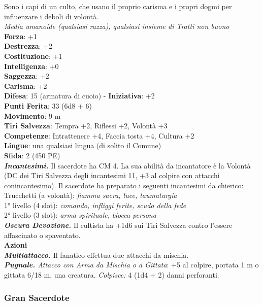 \begin{multicols}{2}
Sono i capi di un culto, che usano il proprio carisma e i propri dogmi per influenzare i deboli di volontà.\\
\emph{Media umanoide (qualsiasi razza), qualsiasi insieme di Tratti non buono}\\
\textbf{Forza}: +1\\
\textbf{Destrezza}: +2\\
\textbf{Costituzione}: +1\\
\textbf{Intelligenza}: +0\\
\textbf{Saggezza}: +2\\
\textbf{Carisma}: +2\\
\textbf{Difesa}: 15 (armatura di cuoio) - \textbf{Iniziativa}: +2\\
\textbf{Punti Ferita}: 33 (6d8 + 6)\\
\textbf{Movimento}: 9 m\\
\textbf{Tiri Salvezza}: Tempra +2, Riflessi +2, Volontà +3 \\
\textbf{Competenze}: Intrattenere +4, Faccia tosta +4, Cultura +2\\
\textbf{Lingue}: una qualsiasi lingua (di solito il Comune)\\
\textbf{Sfida}: 2 (450 PE)\smallskip\\
\emph{\textbf{Incantesimi.}} Il sacerdote ha CM 4. La sua abilità da incantatore è la Volontà (DC dei Tiri Salvezza degli incantesimi 11, +3 al colpire con attacchi conincantesimo). Il sacerdote ha preparato i seguenti incantesimi da chierico:\\
Trucchetti (a volontà): \emph{fiamma sacra, luce, taumaturgia} \\
1° livello (4 slot): \emph{comando, infliggi ferite, scudo della fede}\\
2° livello (3 slot): \emph{arma spirituale, blocca persona}\\
\emph{\textbf{Oscura Devozione.}} Il cultista ha +1d6 sui Tiri Salvezza contro l'essere affascinato o spaventato.\\
\smallskip\textbf{Azioni}\\
\emph{\textbf{Multiattacco.}} Il fanatico effettua due attacchi da mischia.\\
\emph{\textbf{Pugnale.} Attacco con Arma da Mischia o a Gittata}: +5 al colpire, portata 1 m o gittata 6/18 m, una creatura. \emph{Colpisce:} 4 (1d4 + 2) danni perforanti. \\

\subsubsection{Gran Sacerdote}


\end{multicols}

